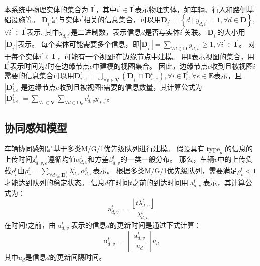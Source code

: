 本系统中物理实体的集合为 $\mathbf{I}^{\prime}$，其中$i^{\prime} \in \mathbf{I}^{\prime}$表示物理实体，如车辆、行人和路侧基础设施等。
$\mathbf{D}_{i^{\prime}}$是与实体$i^{\prime}$相关的信息集合，可以用$\mathbf{D}_{i^{\prime}}=\left\{d \mid y_{d, i^{\prime}} = 1, \forall d \in \mathbf{D} \right\}$, $\forall i^{\prime} \in \mathbf{I}^{\prime}$表示, 其中$y_{d, i^{\prime}}$是二进制数，表示信息$d$是否与实体$i^{\prime}$关联。
$\mathbf{D}_{i^{\prime}}$的大小用$|\mathbf{D}_{i^{\prime}}|$表示。
每个实体可能需要多个信息，即$|\mathbf{D}_{i^{\prime}}| = \sum_{\forall d \in \mathbf{D}}y_{d, i^{\prime}} \geq 1, \forall i^{\prime} \in \mathbf{I}^{\prime}$。
对于每个实体$i^{\prime} \in \mathbf{I}^{\prime}$，可能有一个视图$i$在边缘节点中建模。
用$\mathbf{I}$表示视图的集合，用$\mathbf{I}_e^{t}$表示时间为$t$时在边缘节点$e$中建模的视图集合。
因此，边缘节点$e$收到且被视图$i$需要的信息集合可以用$\mathbf{D}_{i, e}^t=\bigcup_{\forall v \in \mathbf{V}}\left(\mathbf{D}_{i^{\prime}} \cap \mathbf{D}_{v, e}^t\right), \forall i \in \mathbf{I}_e^{t}, \forall e \in \mathbf{E}$表示，且 $| \mathbf{D}_{i, e}^t |$是边缘节点$e$收到且被视图$i$需要的信息数量，其计算公式为$| \mathbf{D}_{i, e}^t | =  \sum_{\forall v \in \mathbf{V}} \sum_{\forall d \in \mathbf{D}_v} c_{d, v}^t  y_{d, i^{\prime}}$。

\subsection[\hspace{-2pt}协同感知模型]{{ \hspace{-8pt}协同感知模型}}
车辆协同感知是基于多类M/G/1优先级队列\cite{moltafet2020age}进行建模。
假设具有$\operatorname{type}_d$的信息的上传时间$\operatorname{\hat{g}}_{d, v, e}^t$遵循均值$\alpha_{d, v}^t$和方差$\beta_{d, v}^t$的一类一般分布。
那么，车辆$v$中的上传负载$\rho_{v}^{t}$由$ \rho_{v}^{t}=\sum_{\forall d \subseteq \mathbf{D}_v^t} \lambda_{d, v}^{t} \alpha_{d, v}^t$表示。
根据多类M/G/1优先级队列，需要满足$\rho_{v}^{t} < 1$才能达到队列的稳定状态。
信息$d$在时间$t$之前的到达时间用$\operatorname{a}_{d, v}^t$表示，其计算公式为：
\begin{equation}
    \operatorname{a}_{d, v}^t =  \frac{\left \lfloor t \lambda_{d, v}^t \right \rfloor }{\lambda_{d, v}^{t}} 
\end{equation}
在时间$t$之前，由$\operatorname{u}_{d, v}^t$表示的信息$d$的更新时间是通过下式计算：
\begin{equation}
    \operatorname{u}_{d, v}^t = \left \lfloor  \frac{\operatorname{a}_{d, v}^t}{u_d} \right \rfloor  u_d
\end{equation}
其中$u_d$是信息$d$的更新间隔时间。


